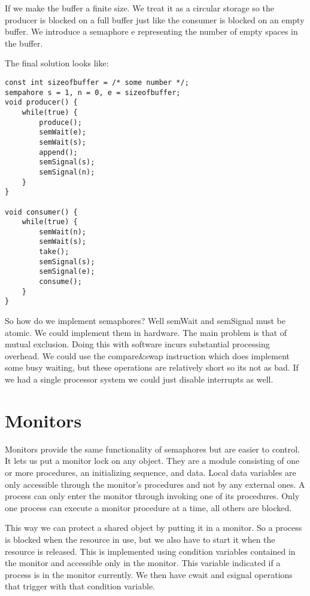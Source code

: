 \documentclass[12pt]{article}
\begin{document}
If we make the buffer a finite size. We treat it as a circular storage so the producer is blocked on a full buffer just like the consumer is blocked on an empty buffer. We introduce a semaphore e representing the number of empty spaces in the buffer.

The final solution looks like:
\begin{lstlisting}
const int sizeofbuffer = /* some number */;
sempahore s = 1, n = 0, e = sizeofbuffer;
void producer() {
    while(true) {
        produce();
        semWait(e);
        semWait(s);
        append();
        semSignal(s);
        semSignal(n);
    }
}

void consumer() {
    while(true) {
        semWait(n);
        semWait(s);
        take();
        semSignal(s);
        semSignal(e);
        consume();
    }
}
\end{lstlisting}

So how do we implement semaphores? Well semWait and semSignal must be atomic. We could implement them in hardware. The main problem is that of mutual exclusion. Doing this with software incurs substantial processing overhead. We could use the compare\&swap instruction which does implement some busy waiting, but these operations are relatively short so its not as bad. If we had a single processor system we could just disable interrupts as well.

\section{Monitors}
Monitors provide the same functionality of semaphores but are easier to control. It lets us put a monitor lock on any object. They are a module consisting of one or more procedures, an initializing sequence, and data. Local data variables are only accessible through the monitor's procedures and not by any external ones. A process can only enter the monitor through invoking one of its procedures. Only one process can execute a monitor procedure at a time, all others are blocked.

This way we can protect a shared object by putting it in a monitor. So a process is blocked when the resource in use, but we also have to start it when the resource is released. This is implemented using condition variables contained in the monitor and accessible only in the monitor. This variable indicated if a process is in the monitor currently. We then have cwait and csignal operations that trigger with that condition variable.
\end{document}
